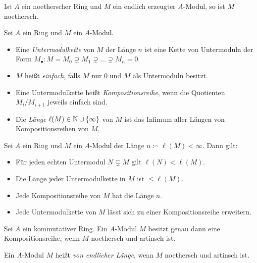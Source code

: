 \documentclass{cheat-sheet}
\newcommand{\len}{\ell} %
\begin{document}
\begin{prop}
  Ist $A$ ein noetherscher Ring und $M$ ein endlich erzeugter $A$-Modul, so ist $M$ noethersch.
\end{prop}



\begin{defn}
  Sei $A$ ein Ring und $M$ ein $A$-Modul.
  \begin{itemize}
    \item Eine \emph{Untermodulkette} von $M$ der Länge $n$ ist eine Kette von Untermoduln der Form $M_\bullet : M = M_0 \supsetneq M_1 \supsetneq \ldots \supsetneq M_n = 0$.
    \item $M$ heißt \emph{einfach}, falls $M$ nur $0$ und $M$ als Untermoduln besitzt.
    \item Eine Untermodulkette heißt \emph{Kompositionsreihe}, wenn die Quotienten $M_i/M_{i+1}$ jeweils einfach sind.
    \item Die \emph{Länge} $\len(M) \in \N \cup \{ \infty \}$ von $M$ ist das Infimum aller Längen von Kompositionsreihen von $M$.
  \end{itemize}
\end{defn}

\begin{prop}
  Sei $A$ ein Ring und $M$ ein $A$-Modul der Länge $n \coloneqq \len(M) < \infty$.
  Dann gilt:
  \begin{itemize}
    \item Für jeden echten Untermodul $N \subsetneq M$ gilt $\len(N) < \len(M)$.
    \item Die Länge jeder Untermodulkette in $M$ ist $\leq \len(M)$.
    \item Jede Kompositionsreihe von $M$ hat die Länge $n$.
    \item Jede Untermodulkette von $M$ lässt sich zu einer Kompositionsreihe erweitern.
  \end{itemize}
\end{prop}


\begin{prop}
  Sei $A$ ein kommutativer Ring.
  Ein $A$-Modul $M$ besitzt genau dann eine Kompositionsreihe, wenn $M$ noethersch und artinsch ist.
\end{prop}

\begin{defn}
  Ein $A$-Modul $M$ heißt \emph{von endlicher Länge}, wenn $M$ noethersch und artinsch ist.
\end{defn}
\end{document}
